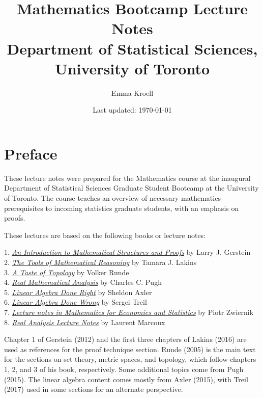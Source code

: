 \documentclass{article}
\title{Mathematics Bootcamp Lecture Notes \\
\vspace{0.5em}
\large Department of Statistical Sciences, University of Toronto}
\author{Emma Kroell}
\date{Last updated: \today}
\begin{document}
\maketitle


\newpage
\section*{Preface}

These lecture notes were prepared for the Mathematics course at the inaugural Department of Statistical Sciences Graduate Student Bootcamp at the University of Toronto. The course teaches an overview of necessary mathematics prerequisites to incoming statistics graduate students, with an emphasis on proofs.


These lectures are based on the following books or lecture notes:

1. \href{https://link-springer-com.myaccess.library.utoronto.ca/book/10.1007/978-1-4614-4265-3}{{\emph{An Introduction to Mathematical Structures and Proofs}}} by Larry J. Gerstein \\
2. \href{https://bookstore.ams.org/amstext-26/}{{\emph{The Tools of Mathematical Reasoning}}} by Tamara J. Lakins \\
3. \href{https://link-springer-com.myaccess.library.utoronto.ca/book/10.1007/0-387-28387-0}{\emph{A Taste of Topology}} by Volker Runde \\
4. \href{https://link-springer-com.myaccess.library.utoronto.ca/book/10.1007/978-3-319-17771-7}{\emph{Real Mathematical Analysis}} by Charles C. Pugh \\
5. \href{https://link-springer-com.myaccess.library.utoronto.ca/book/10.1007/978-3-319-11080-6}{{\emph{Linear Algebra Done Right}}} by Sheldon Axler \\
6. \href{https://www.math.brown.edu/streil/papers/LADW/LADW.html}{{\emph{Linear Algebra Done Wrong}}} by Sergei Treil \\
7. \href{http://84.89.132.1/~piotr/docs/RealAnalysisNotes.pdf}{\emph{Lecture notes in Mathematics for Economics and Statistics}} by Piotr Zwiernik \\
8. \href{http://www.math.uwaterloo.ca/~lwmarcou/notes/pmath351.pdf}{{\emph{Real Analysis Lecture Notes}}} by Laurent Marcoux

Chapter 1 of Gerstein (2012) and the first three chapters of Lakins (2016) are used as references for the proof technique section. Runde (2005) is the main text for the sections on set theory, metric spaces, and topology, which follow chapters 1, 2, and 3 of his book, respectively. Some additional topics come from Pugh (2015). The linear algebra content comes mostly from Axler (2015), with Treil (2017) used in some sections for an alternate perspective.
\end{document}
